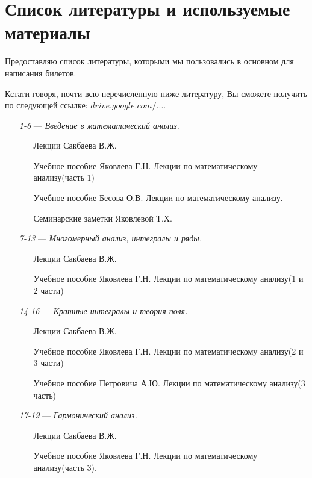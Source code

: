 \chapter{Список литературы и используемые материалы}

Предоставляю список литературы, которыми мы пользовались в основном для написания билетов. 

Кстати говоря, почти всю перечисленную ниже литературу, Вы сможете получить по следующей ссылке: \href{https://drive.google.com/drive/u/0/folders/0BzuzEyNkpwYDcENXcV9jNWdwVlU}{$drive.google.com/...$}.

\begin{itemize}
\item[\textit{1-6}]
\; --- \: \textit{Введение в математический анализ.} 
\begin{itemize}
\item[\textbullet]
Лекции Сакбаева В.Ж.
\item[\textbullet]
Учебное пособие Яковлева Г.Н. \glqq Лекции по математическому анализу\grqq (часть 1)
\item[\textbullet]
Учебное пособие Бесова О.В. \glqq Лекции по математическому анализу\grqq.
\item[\textbullet]
Семинарские заметки Яковлевой Т.Х.
\end{itemize}

\item[\textit{7-13}] 
\; --- \: \textit{Многомерный анализ, интегралы и ряды.}
\begin{itemize}
\item[\textbullet]
Лекции Сакбаева В.Ж.
\item[\textbullet]
Учебное пособие Яковлева Г.Н. \glqq Лекции по математическому анализу\grqq (1 и 2 части)
\end{itemize}

\item[\textit{14-16}] 
\; --- \: \textit{Кратные интегралы и теория поля.}
\begin{itemize}
\item[\textbullet]
Лекции Сакбаева В.Ж.
\item[\textbullet]
Учебное пособие Яковлева Г.Н. \glqq Лекции по математическому анализу\grqq (2 и 3 части)
\item[\textbullet]
Учебное пособие Петровича А.Ю. \glqq Лекции по математическому анализу\grqq (3 часть)
\end{itemize}

\item[\textit{17-19}] 
\; --- \: \textit{Гармонический анализ.}
\begin{itemize}
\item[\textbullet]
Лекции Сакбаева В.Ж.
\item[\textbullet]
Учебное пособие Яковлева Г.Н. \glqq Лекции по математическому анализу\grqq  (часть 3).
\end{itemize}


\end{itemize}
